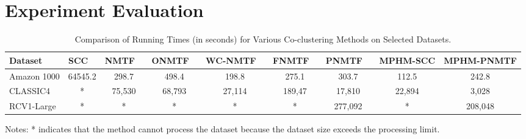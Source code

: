 \documentclass[journal]{IEEEtran}
\renewcommand{\cite}[1]{~\autocite{#1}}
\begin{document}
\section{Experiment Evaluation}
\label{sec:experiment}


\begin{table}[htbp]
  \centering
  \caption{Comparison of Running Times (in seconds) for Various Co-clustering Methods on Selected Datasets.}
  \label{tab:running-time}
  \begin{tabular}{@{} l cccccccc @{}}
    \toprule
    Dataset     & SCC \cite{dhillon2001CoclusteringDocumentsWords}
                & NMTF \cite{long2005CoclusteringBlockValue}
                & ONMTF \cite{ding2006OrthogonalNonnegativeMatrix}
                & WC-NMTF \cite{salah2018WordCooccurrenceRegularized}
                & FNMTF \cite{kim2011FastNonnegativeMatrix}
                & PNMTF \cite{chen2023ParallelNonNegativeMatrix}      & \textbf{MPHM-SCC} & \textbf{MPHM-PNMTF}                                                \\
    \midrule
    Amazon 1000 & 64545.2                                             & 298.7             & 498.4               & 198.8  & 275.1  & 303.7   & 112.5  & 242.8   \\
    CLASSIC4    & *                                                   & 75,530            & 68,793              & 27,114 & 189,47 & 17,810  & 22,894 & 3,028   \\
    RCV1-Large  & *                                                   & *                 & *                   & *      & *      & 277,092 & *      & 208,048 \\
    \bottomrule
  \end{tabular}
  \begin{tablenotes}
    \small
    \item Notes: * indicates that the method cannot process the dataset because the dataset size exceeds the processing limit.
  \end{tablenotes}
\end{table}
\end{document}
